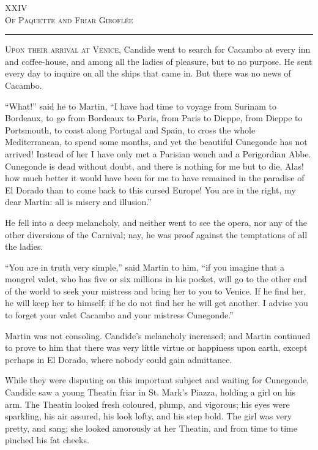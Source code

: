 \begin{center}
XXIV\\
\textsc{Of Paquette and Friar Giroflée}
\end{center}
\vspace{-0.5cm}
\rule{\textwidth}{0.5pt}
\lettrine{U}{pon their arrival at Venice}, Candide went to search for Cacambo at every inn and coffee-house, and among all the ladies of pleasure, but to no purpose. He sent every day to inquire on all the ships that came in. But there was no news of Cacambo.

``What!'' said he to Martin, ``I have had time to voyage from Surinam to Bordeaux, to go from Bordeaux to Paris, from Paris to Dieppe, from Dieppe to Portsmouth, to coast along Portugal and Spain, to cross the whole Mediterranean, to spend some months, and yet the beautiful Cunegonde has not arrived! Instead of her I have only met a Parisian wench and a Perigordian Abbe. Cunegonde is dead without doubt, and there is nothing for me but to die. Alas! how much better it would have been for me to have remained in the paradise of El Dorado than to come back to this cursed Europe! You are in the right, my dear Martin: all is misery and illusion.''

He fell into a deep melancholy, and neither went to see the opera, nor any of the other diversions of the Carnival; nay, he was proof against the temptations of all the ladies.

``You are in truth very simple,'' said Martin to him, ``if you imagine that a mongrel valet, who has five or six millions in his pocket, will go to the other end of the world to seek your mistress and bring her to you to Venice. If he find her, he will keep her to himself; if he do not find her he will get another. I advise you to forget your valet Cacambo and your mistress Cunegonde.''

Martin was not consoling. Candide's melancholy increased; and Martin continued to prove to him that there was very little virtue or happiness upon earth, except perhaps in El Dorado, where nobody could gain admittance.

While they were disputing on this important subject and waiting for Cunegonde, Candide saw a young Theatin friar in St. Mark's Piazza, holding a girl on his arm. The Theatin looked fresh coloured, plump, and vigorous; his eyes were sparkling, his air assured, his look lofty, and his step bold. The girl was very pretty, and sang; she looked amorously at her Theatin, and from time to time pinched his fat cheeks.

